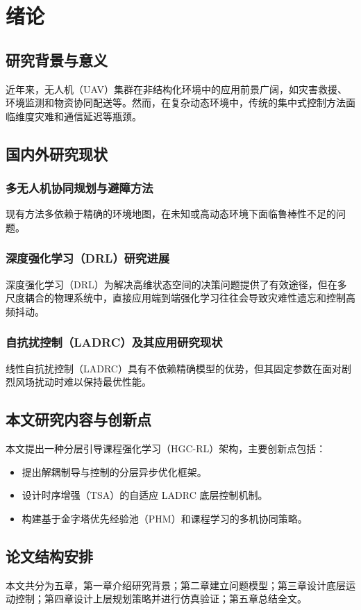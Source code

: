 \chapter{绪论}
\section{研究背景与意义}
近年来，无人机（UAV）集群在非结构化环境中的应用前景广阔，如灾害救援、环境监测和物资协同配送等。然而，在复杂动态环境中，传统的集中式控制方法面临维度灾难和通信延迟等瓶颈。

\section{国内外研究现状}
\subsection{多无人机协同规划与避障方法}
现有方法多依赖于精确的环境地图，在未知或高动态环境下面临鲁棒性不足的问题。

\subsection{深度强化学习（DRL）研究进展}
深度强化学习（DRL）为解决高维状态空间的决策问题提供了有效途径，但在多尺度耦合的物理系统中，直接应用端到端强化学习往往会导致灾难性遗忘和控制高频抖动。

\subsection{自抗扰控制（LADRC）及其应用研究现状}
线性自抗扰控制（LADRC）具有不依赖精确模型的优势，但其固定参数在面对剧烈风场扰动时难以保持最优性能。

\section{本文研究内容与创新点}
本文提出一种分层引导课程强化学习（HGC-RL）架构，主要创新点包括：
\begin{itemize}
    \item 提出解耦制导与控制的分层异步优化框架。
    \item 设计时序增强（TSA）的自适应 LADRC 底层控制机制。
    \item 构建基于金字塔优先经验池（PHM）和课程学习的多机协同策略。
\end{itemize}

\section{论文结构安排}
本文共分为五章，第一章介绍研究背景；第二章建立问题模型；第三章设计底层运动控制；第四章设计上层规划策略并进行仿真验证；第五章总结全文。
